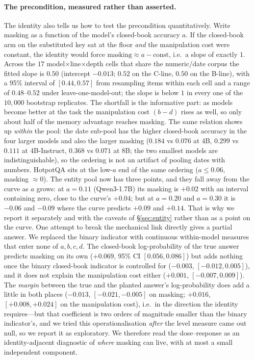 \documentclass[11pt]{article}
\newcommand{\mask}{\ensuremath{\mathrm{masking}}}
\begin{document}
\paragraph{The precondition, measured rather than asserted.} The identity also tells us how
to test the precondition quantitatively. Write masking as a function of the model's
closed-book accuracy $a$. If the closed-book arm on the substituted key sat at the floor
\emph{and} the manipulation cost were constant, the identity would force
$\mask\approx a-\text{const}$, i.e.\ a slope of exactly $1$. Across the $17$
model$\times$line$\times$depth cells that share the numeric/date corpus the fitted slope is
$0.50$ (intercept $-0.013$; $0.52$ on the C-line, $0.50$ on the B-line), with a 95\% interval
of $[0.44,0.57]$ from resampling items within each cell and a range of $0.48$--$0.52$ under
leave-one-model-out; the slope is below $1$ in every one of the $10{,}000$ bootstrap
replicates. The shortfall is the informative part: as models become better at the task the
manipulation cost $(b-d)$ rises as well, so only about half of the memory advantage reaches
masking. The same relation shows up \emph{within} the pool: the date sub-pool has the higher
closed-book accuracy in the four larger models and also the larger masking ($0.184$ vs
$0.076$ at 4B, $0.299$ vs $0.111$ at 4B-Instruct, $0.368$ vs $0.071$ at 8B; the two smallest
models are indistinguishable), so the ordering is not an artifact of pooling dates with
numbers. HotpotQA sits at the low-$a$ end of the same ordering ($a\le0.06$, masking
$\approx0$). The entity pool now has three points, and they fall away from the curve as $a$
grows: at $a{=}0.11$ (Qwen3-1.7B) its masking is $+0.02$ with an interval containing zero, close
to the curve's $+0.04$; but at $a{=}0.20$ and $a{=}0.30$ it is $-0.06$ and $-0.09$ where the curve
predicts $+0.09$ and $+0.14$. That is why we report it separately and with the caveats of
\S\ref{sec:entity} rather than as a point on the
curve. One attempt to break the mechanical link directly gives a partial answer. We
replaced the binary indicator with continuous within-model measures that enter none of
$a,b,c,d$. The closed-book log-probability of the true answer predicts masking on its own
($+0.069$, 95\% CI $[0.056,0.086]$) but adds nothing once the binary closed-book indicator is
controlled for ($-0.003$, $[-0.012,0.005]$), and it does not explain the manipulation cost
either ($+0.001$, $[-0.007,0.009]$). The \emph{margin} between the true and the planted
answer's log-probability does add a little in both places ($-0.013$, $[-0.021,-0.005]$ on
masking; $+0.016$, $[+0.008,+0.024]$ on the manipulation cost), i.e.\ in the direction the
identity requires---but that coefficient is two orders of magnitude smaller than the binary
indicator's, and we tried this operationalisation \emph{after} the level measure came out null,
so we report it as exploratory. We therefore read the dose--response as an identity-adjacent
diagnostic of \emph{where} masking can live, with at most a small independent component.
\end{document}
